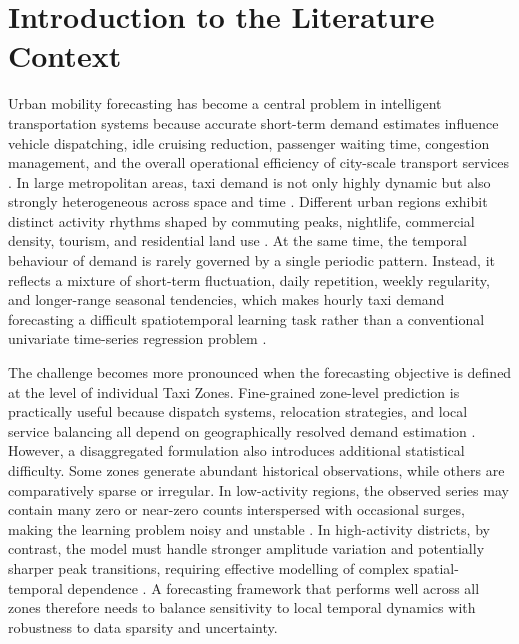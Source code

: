 \documentclass[12pt,a4paper]{report}
\begin{document}
\section{Introduction to the Literature Context}

Urban mobility forecasting has become a central problem in intelligent transportation systems because accurate short-term demand estimates influence vehicle dispatching, idle cruising reduction, passenger waiting time, congestion management, and the overall operational efficiency of city-scale transport services \cite{liu2022survey,khalesian2024area}. In large metropolitan areas, taxi demand is not only highly dynamic but also strongly heterogeneous across space and time \cite{qian_2015_spatial,tang2019spatiotemporal}. Different urban regions exhibit distinct activity rhythms shaped by commuting peaks, nightlife, commercial density, tourism, and residential land use \cite{tang2019spatiotemporal}. At the same time, the temporal behaviour of demand is rarely governed by a single periodic pattern. Instead, it reflects a mixture of short-term fluctuation, daily repetition, weekly regularity, and longer-range seasonal tendencies, which makes hourly taxi demand forecasting a difficult spatiotemporal learning task rather than a conventional univariate time-series regression problem \cite{jiang2022survey,liao2022taxi}.

The challenge becomes more pronounced when the forecasting objective is defined at the level of individual Taxi Zones. Fine-grained zone-level prediction is practically useful because dispatch systems, relocation strategies, and local service balancing all depend on geographically resolved demand estimation \cite{khalesian2024area,riley2020dispatch}. However, a disaggregated formulation also introduces additional statistical difficulty. Some zones generate abundant historical observations, while others are comparatively sparse or irregular. In low-activity regions, the observed series may contain many zero or near-zero counts interspersed with occasional surges, making the learning problem noisy and unstable \cite{zhuang2022sparse}. In high-activity districts, by contrast, the model must handle stronger amplitude variation and potentially sharper peak transitions, requiring effective modelling of complex spatial-temporal dependence \cite{wu2019graph,huang2022dstgnn}. A forecasting framework that performs well across all zones therefore needs to balance sensitivity to local temporal dynamics with robustness to data sparsity and uncertainty.
\end{document}

